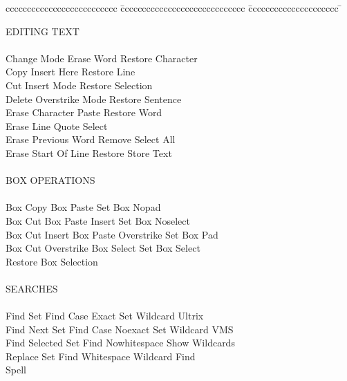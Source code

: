 \begin{tabbing}
cccccccccccccccccccccccccc \= ccccccccccccccccccccccccccccc \= ccccccccccccccccccccc \= \kill

 EDITING TEXT \\
 \\
    Change Mode           \>  Erase Word       \>    Restore Character   \\
    Copy                  \>  Insert Here      \>    Restore Line        \\
    Cut                   \>  Insert Mode      \>    Restore Selection   \\
    Delete                \>  Overstrike Mode  \>    Restore Sentence    \\
    Erase Character       \>  Paste            \>    Restore Word        \\
    Erase Line            \>  Quote            \>    Select              \\
    Erase Previous Word   \>  Remove           \>    Select All          \\
    Erase Start Of Line   \>  Restore          \>    Store Text          \\
 \\
 BOX OPERATIONS\\
 \\
    Box Copy           \> Box Paste             \> Set Box Nopad         \\
    Box Cut            \> Box Paste Insert      \> Set Box Noselect      \\
    Box Cut Insert     \> Box Paste Overstrike  \> Set Box Pad           \\
    Box Cut Overstrike \> Box Select            \> Set Box Select        \\
                       \> Restore Box Selection \>                       \\
 \\
 SEARCHES\\
\\
    Find             \>  Set Find Case Exact    \> Set Wildcard Ultrix   \\
    Find Next        \>  Set Find Case Noexact  \> Set Wildcard VMS      \\
    Find Selected    \>  Set Find Nowhitespace  \> Show Wildcards        \\
    Replace          \>  Set Find Whitespace    \> Wildcard Find         \\
    Spell            \>                         \>                       \\

\end{tabbing}
